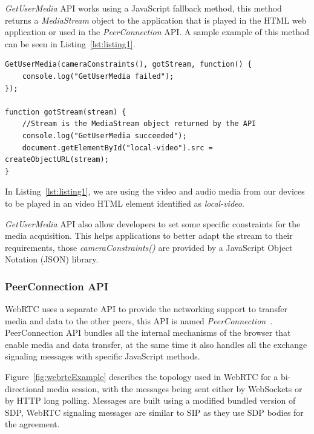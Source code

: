 {\it GetUserMedia} API works using a JavaScript fallback method, this method returns a {\it MediaStream} object to the application that is played in the HTML web application or used in the {\it PeerConnection} API. A sample example of this method can be seen in Listing~\ref{lst:listing1}.

\lstset{language=JavaScript}
\begin{lstlisting}[caption={Simple example of video and audio access using JavaScript},label={lst:listing1}]
GetUserMedia(cameraConstraints(), gotStream, function() {
	console.log("GetUserMedia failed");
});
    
function gotStream(stream) {
	//Stream is the MediaStream object returned by the API
	console.log("GetUserMedia succeeded");
  	document.getElementById("local-video").src = createObjectURL(stream);
}
\end{lstlisting}

In Listing~\ref{lst:listing1}, we are using the video and audio media from our devices to be played in an video HTML element identified as {\it local-video}. 

{\it GetUserMedia} API also allow developers to set some specific constraints for the media acquisition. This helps applications to better adapt the stream to their requirements, those {\it cameraConstraints()} are provided by a JavaScript Object Notation (JSON)  library.

\subsubsection{PeerConnection API}
\label{sec:pcAPI}

WebRTC uses a separate API to provide the networking support to transfer media and data to the other peers, this API is named {\it PeerConnection}~\cite{editorWebRTCdraft}. PeerConnection API bundles all the internal mechanisms of the browser that enable media and data transfer, at the same time it also handles all the exchange signaling messages with specific JavaScript methods. 

Figure~\ref{fig:webrtcExample} describes the topology used in WebRTC for a bi-directional media session, with the messages being sent either by WebSockets or by HTTP long polling. Messages are built using a modified bundled version of SDP, WebRTC signaling messages are similar to SIP as they use SDP bodies for the agreement.


